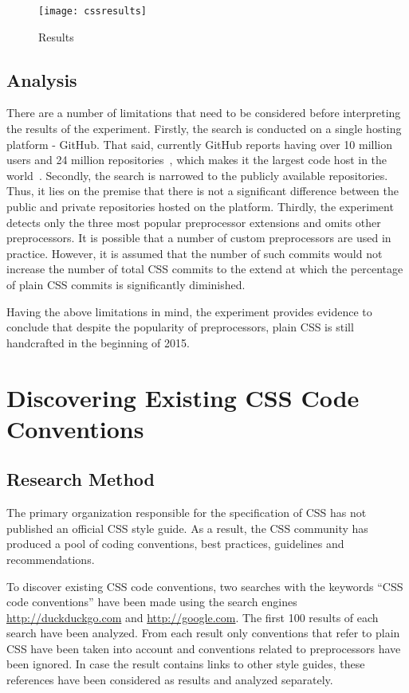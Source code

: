 \documentclass[parskip=full]{uvamscse}
\begin{document}
\begin{figure}[h!]
  \centering
  \caption{Results}
  \texttt{[image: cssresults]}
\end{figure}

\section{Analysis}

There are a number of limitations that need to be considered before interpreting the results of the
experiment. Firstly, the search is conducted on a single hosting platform - GitHub. That said, currently
GitHub reports having over 10 million users and 24 million repositories~\cite{GitHub}, which makes
it the largest code host in the world~\cite{gousios2014lean}. Secondly, the search is narrowed to
the publicly available repositories. Thus, it lies on the premise that there is not a significant
difference between the public and private repositories hosted on the platform. Thirdly, the
experiment detects only the three most popular preprocessor extensions and omits other
preprocessors. It is possible that a number of custom preprocessors are used in practice. However,
it is assumed that the number of such commits would not increase the number of total CSS commits to
the extend at which the percentage of plain CSS commits is significantly diminished.

Having the above limitations in mind, the experiment provides evidence to conclude that despite the popularity of preprocessors, plain CSS is still handcrafted in the beginning of 2015.


\chapter{Discovering Existing CSS Code Conventions}

\section{Research Method}

The primary organization responsible for the specification of CSS has not published an official CSS
style guide. As a result, the CSS community has produced a pool of coding conventions, best
practices, guidelines and recommendations.

To discover existing CSS code conventions, two searches with the keywords ``CSS code conventions''
have been made using the search engines \url{http://duckduckgo.com} and \url{http://google.com}. The
first 100 results of each search have been analyzed. From each result only conventions that refer to
plain CSS have been taken into account and conventions related to preprocessors have been ignored.
In case the result contains links to other style guides, these references have been considered as
results and analyzed separately.
\end{document}

